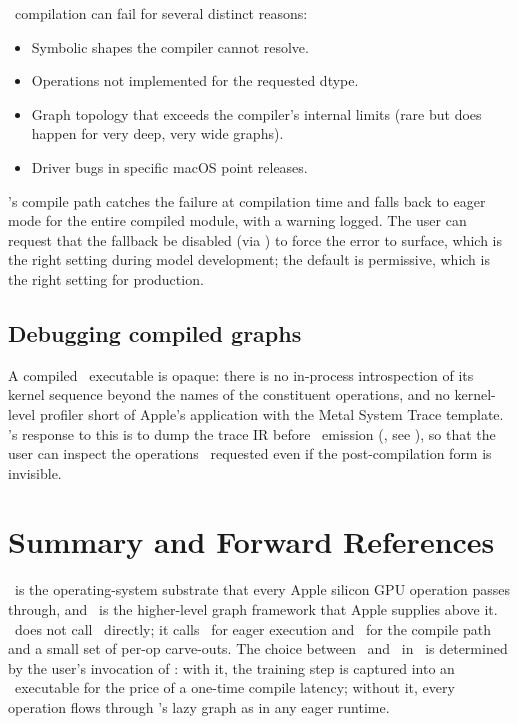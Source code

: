 \MPSGraph\ compilation can fail for several distinct reasons:
\begin{itemize}
  \item Symbolic shapes the compiler cannot resolve.
  \item Operations not implemented for the requested dtype.
  \item Graph topology that exceeds the compiler's internal limits
    (rare but does happen for very deep, very wide graphs).
  \item Driver bugs in specific macOS point releases.
\end{itemize}

\Lucid's compile path catches the failure at compilation time and
falls back to eager mode for the entire compiled module, with a
warning logged. The user can request that the fallback be disabled
(via ) to force the error to surface,
which is the right setting during model development; the default is
permissive, which is the right setting for production.

\subsection{Debugging compiled graphs}
\label{ssec:metal_mpsgraph:debug}

A compiled \MPSGraph\ executable is opaque: there is no in-process
introspection of its kernel sequence beyond the names of the
constituent operations, and no kernel-level profiler short of
Apple's  application with the Metal System Trace
template. \Lucid's response to this is to dump the trace IR before
\MPSGraph\ emission (, see
), so that the user can inspect the operations
\Lucid\ requested even if the post-compilation form is invisible.

\section{Summary and Forward References}
\label{sec:metal_mpsgraph:summary}

\Metal\ is the operating-system substrate that every Apple silicon
GPU operation passes through, and \MPSGraph\ is the higher-level
graph framework that Apple supplies above it. \Lucid\ does not call
\Metal\ directly; it calls \MLX\ for eager execution and \MPSGraph\
for the compile path and a small set of per-op carve-outs. The
choice between \MLX\ and \MPSGraph\ in \Lucid\ is determined by the
user's invocation of \code{lucid.compile}: with it, the training
step is captured into an \MPSGraph\ executable for the price of a
one-time compile latency; without it, every operation flows through
\MLX's lazy graph as in any eager runtime.

